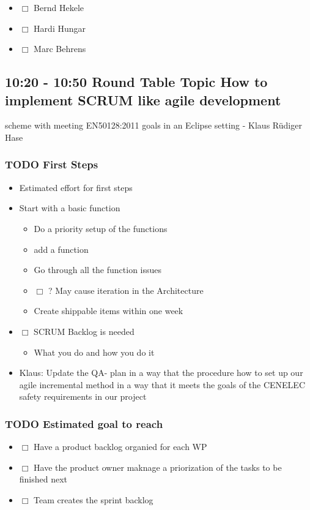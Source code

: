 \documentclass[a4paper,german]{article}
\begin{document}
\begin{itemize}
\item $\Box$ Bernd Hekele
\item $\Box$ Hardi Hungar
\item $\Box$ Marc Behrens
\end{itemize}
\subsection{10:20 - 10:50 Round Table Topic How to implement SCRUM like agile development}
\label{sec-1-3}

                   scheme with meeting EN50128:2011 goals in an Eclipse setting - Klaus Rüdiger Hase
\subsubsection{\textbf{TODO} First Steps}
\label{sec-1-3-1}

\begin{itemize}
\item Estimated effort for first steps
\item Start with a basic function
\begin{itemize}
\item Do a priority setup of the functions
\item add a function
\item Go through all the function issues
\item $\Box$ ? May cause iteration in the Architecture
\item Create shippable items within one week
\end{itemize}
\item $\Box$ SCRUM Backlog is needed
\begin{itemize}
\item What you do and how you do it
\end{itemize}
\item Klaus: Update the QA- plan in a way that the procedure how to set up our 
        agile incremental method in a way that it meets the goals of the CENELEC 
        safety requirements in our project
\end{itemize}

      
\subsubsection{\textbf{TODO} Estimated goal to reach}
\label{sec-1-3-2}

\begin{itemize}
\item $\Box$ Have a product backlog organied for each WP
\item $\Box$ Have the product owner maknage a priorization of the tasks to be finished next
\item $\Box$ Team creates the sprint backlog
\end{itemize}
\end{document}
